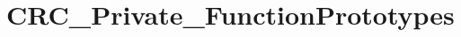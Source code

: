 \hypertarget{group___c_r_c___private___function_prototypes}{}\section{C\+R\+C\+\_\+\+Private\+\_\+\+Function\+Prototypes}
\label{group___c_r_c___private___function_prototypes}
